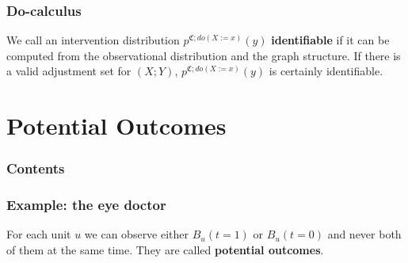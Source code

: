 \documentclass{beamer}
\begin{document}
\begin{frame}
    \frametitle{Do-calculus}
    \begin{flushleft}
        We call an intervention distribution $p^{\mathfrak{C};do(X:=x)}(y)$ \textbf{identifiable} if it can be
        computed from the observational distribution and the graph structure. If there is a
        valid adjustment set for $(X;Y)$, $p^{\mathfrak{C};do(X:=x)}(y)$ is certainly identifiable.
    \end{flushleft}
\end{frame}

\section{Potential Outcomes}

\begin{frame}
    \frametitle{Contents}
    \tableofcontents[currentsection]
\end{frame}

\begin{frame}
    \frametitle{Example: the eye doctor}
    \begin{flushleft}
        For each unit $u$ we can observe either $B_u(t=1)$ or $B_u(t=0)$ and never both of them at the same time. They are
        called \textbf{potential outcomes}.
    \end{flushleft}
\end{frame}
\end{document}
